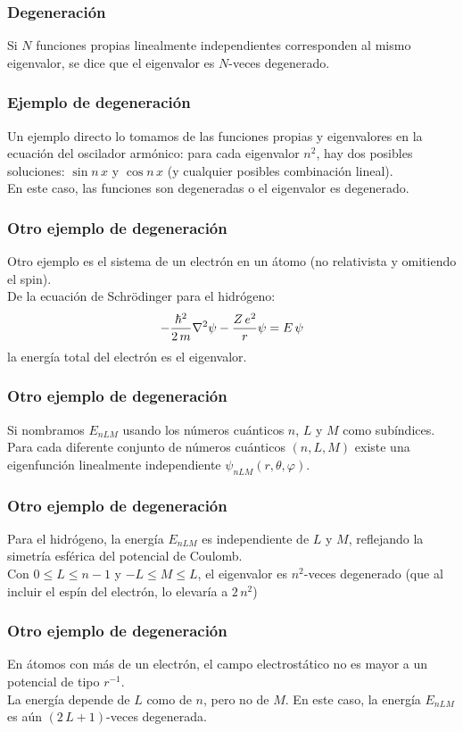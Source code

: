 \documentclass[12pt]{beamer}
\begin{document}
\begin{frame}
\frametitle{Degeneración}
Si $N$ funciones propias linealmente independientes corresponden al mismo eigenvalor, se dice que el eigenvalor es $N$-veces degenerado.
\end{frame}
\begin{frame}
\frametitle{Ejemplo de degeneración}
Un ejemplo directo lo tomamos de las funciones propias y eigenvalores en la ecuación del oscilador armónico: para cada eigenvalor $n^{2}$, hay dos posibles soluciones: $\sin n \, x$ y $\cos n \, x$ (y cualquier posibles combinación lineal). 
\\
\bigskip
\pause
En este caso, las funciones son degeneradas o el eigenvalor es degenerado.
\end{frame}
\begin{frame}
\frametitle{Otro ejemplo de degeneración}
Otro ejemplo es el sistema de un electrón en un átomo (no relativista y omitiendo el spin).
\\
\bigskip
\pause
De la ecuación de Schrödinger para el hidrógeno:
\pause
\begin{align*}
- \dfrac{\hbar^{2}}{2 \, m} \laplacian{\psi} - \dfrac{Z \, e^{2}}{r} \psi =  E \, \psi
\end{align*}
la energía total del electrón es el eigenvalor.
\end{frame}
\begin{frame}
\frametitle{Otro ejemplo de degeneración}
Si nombramos $E_{nLM}$ usando los números cuánticos $n$, $L$ y $M$ como subíndices.
\\
\bigskip
\pause
Para cada diferente conjunto de números cuánticos $(n, L, M)$ existe una eigenfunción linealmente independiente $\psi_{nLM}(r,\theta, \varphi)$.
\end{frame}
\begin{frame}
\frametitle{Otro ejemplo de degeneración}
Para el hidrógeno, la energía $E_{nLM}$ es independiente de $L$ y $M$, reflejando la simetría esférica del potencial de Coulomb.
\\
\bigskip
\pause
Con $0 \leq L \leq n-1$ y $-L \leq M \leq L$, el eigenvalor es $n^{2}$-veces degenerado (que al incluir el espín del electrón, lo elevaría a $2 \, n^{2}$)
\end{frame}
\begin{frame}
\frametitle{Otro ejemplo de degeneración}
En átomos con más de un electrón, el campo electrostático no es mayor a un potencial de tipo $r^{-1}$. 
\\
\bigskip
\pause
La energía depende de $L$ como de $n$, pero no de $M$. En este caso, la energía $E_{nLM}$ es aún $(2 \, L + 1)$-veces degenerada.
\end{frame}
\end{document}
